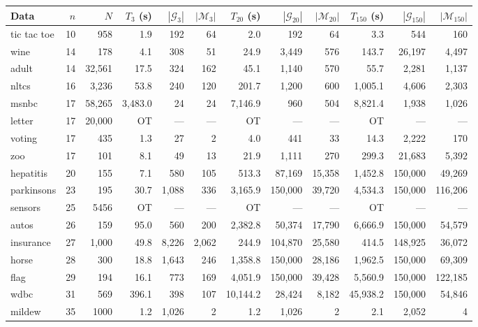 \documentclass[letterpaper]{article}
\newcommand{\yc}{\cellcolor{yellow}}
\newcommand{\graphset}{\mathcal{G}}
\begin{document}
\begin{table}[!ht]
    \centering
    \small
    \begin{tabular}{lrr||rrr||rrr||rrr}
        Data & $n$ & $N$ & $T_{3}$ (s) & $|\graphset_{3}|$ & $|\mathcal{M}_{3}|$ & $T_{20}$ (s) & $|\graphset_{20}|$ & $|\mathcal{M}_{20}|$ & $T_{150}$ (s) & $|\graphset_{150}|$ & $|\mathcal{M}_{150}|$ \\
        \hline
tic tac toe & 10 & 958 & 1.9 & 192 & 64 & 2.0 & 192 & 64 & 3.3 & 544 & 160 \\
wine & 14 & 178 & 4.1 & 308 & 51 & 24.9 & 3,449 & 576 & 143.7 & 26,197 & 4,497 \\
adult & 14 & 32,561 & 17.5 & 324 & 162 & 45.1 & 1,140 & 570 & 55.7 & 2,281 & 1,137 \\
nltcs & 16 & 3,236 & 53.8 & 240 & 120 & 201.7 & 1,200 & 600 & 1,005.1 & 4,606 & 2,303 \\
msnbc & 17 & 58,265 & 3,483.0 & 24 & 24 & 7,146.9 & 960 & 504 & 8,821.4 & 1,938 & 1,026 \\
letter & 17 & 20,000 & \yc OT & --- & --- & \yc OT & --- & --- & \yc OT & --- & --- \\
voting & 17 & 435 & 1.3 & 27 & 2 & 4.0 & 441 & 33 & 14.3 & 2,222 & 170 \\
zoo & 17 & 101 & 8.1 & 49 & 13 & 21.9 & 1,111 & 270 & 299.3 & 21,683 & 5,392 \\
hepatitis & 20 & 155 & 7.1 & 580 & 105 & 513.3 & 87,169 & 15,358 & 1,452.8 & 150,000 & 49,269 \\
parkinsons & 23 & 195 & 30.7 & 1,088 & 336 & 3,165.9 & 150,000 & 39,720 & 4,534.3 & 150,000 & 116,206 \\
sensors & 25 & 5456 & \yc OT & --- & --- & \yc OT & --- & --- & \yc OT & --- & --- \\
autos & 26 & 159 & 95.0 & 560 & 200 & 2,382.8 & 50,374 & 17,790 & 6,666.9 & 150,000 & 54,579 \\
insurance & 27 & 1,000 & 49.8 & 8,226 & 2,062 & 244.9 & 104,870 & 25,580 & 414.5 & 148,925 & 36,072 \\
horse & 28 & 300 & 18.8 & 1,643 & 246 & 1,358.8 & 150,000 & 28,186 & 1,962.5 & 150,000 & 69,309 \\
flag & 29 & 194 & 16.1 & 773 & 169 & 4,051.9 & 150,000 & 39,428 & 5,560.9 & 150,000 & 122,185 \\
wdbc & 31 & 569 & 396.1 & 398 & 107 & 10,144.2 & 28,424 & 8,182 & 45,938.2 & 150,000 & 54,846 \\
mildew & 35 & 1000 & 1.2 & 1,026 & 2 & 1.2 & 1,026 & 2 & 2.1 & 2,052 & 4 \\

\end{tabular}
\end{table}
\end{document}
